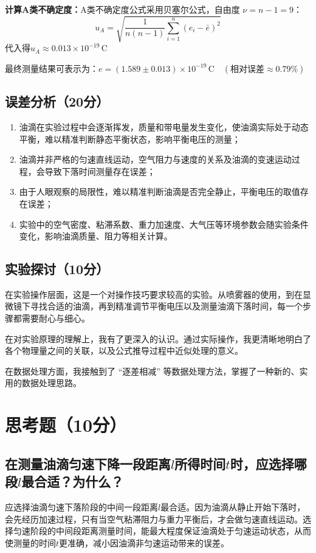 \documentclass[]{../../templates/Report}%
\begin{document}
\begin{fullreportonly}
\vspace{2mm}
\textbf{计算A类不确定度：}A类不确定度公式采用贝塞尔公式，自由度 \( \nu = n-1 = 9 \)：
\[u_A = \sqrt{\frac{1}{n(n-1)} \sum_{i=1}^n (e_i - \bar{e})^2}\]
代入得$u_A \approx 0.013 \times 10^{-19} \, \text{C}$

\vspace{2mm}
最终测量结果可表示为：\(e = (1.589 \pm 0.013) \times 10^{-19} \, \text{C} \quad (\text{相对误差} \approx 0.79\%)\)
\subsection{误差分析（20分）}
\begin{enumerate}
    \item 油滴在实验过程中会逐渐挥发，质量和带电量发生变化，使油滴实际处于动态平衡，难以精准判断静态平衡状态，影响平衡电压的测量；
    \item 油滴并非严格的匀速直线运动，空气阻力与速度的关系及油滴的变速运动过程，会导致下落时间测量存在误差；
    \item 由于人眼观察的局限性，难以精准判断油滴是否完全静止，平衡电压的取值存在误差；
    \item 实验中的空气密度、粘滞系数、重力加速度、大气压等环境参数会随实验条件变化，影响油滴质量、阻力等相关计算。
\end{enumerate}

\subsection{实验探讨（10分）}
在实验操作层面，这是一个对操作技巧要求较高的实验。从喷雾器的使用，到在显微镜下寻找合适的油滴，再到精准调节平衡电压以及测量油滴下落时间，每一个步骤都需要耐心与细心。

\vspace{2mm}
在对实验原理的理解上，我有了更深入的认识。通过实际操作，我更清晰地明白了各个物理量之间的关联，以及公式推导过程中近似处理的意义。

\vspace{2mm}
在数据处理方面，我接触到了 “逐差相减” 等数据处理方法，掌握了一种新的、实用的数据处理思路。

\section{思考题（10分）}
\subsection{在测量油滴匀速下降一段距离$l$所得时间$t$时，应选择哪段$l$最合适？为什么？}
应选择油滴匀速下落阶段的中间一段距离$l$最合适。因为油滴从静止开始下落时，会先经历加速过程，只有当空气粘滞阻力与重力平衡后，才会做匀速直线运动。选择匀速阶段的中间段距离测量时间，能最大程度保证油滴处于匀速运动状态，从而使测量的时间$t$更准确，减小因油滴非匀速运动带来的误差。

\end{fullreportonly}
\end{document}
